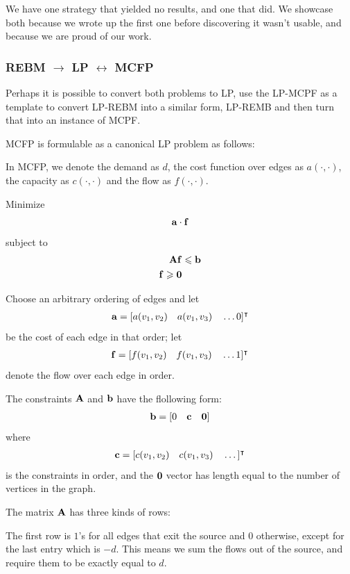 We have one strategy that yielded no results, and one that did. We showcase
both because we wrote up the first one before discovering it wasn't usable,
and because we are proud of our work.

\subsubsection{REBM $\to$ LP $\leftrightarrow$ MCFP}

Perhaps it is possible to convert both problems to LP, use the
LP-MCPF as a template to convert LP-REBM into a similar form, LP-REMB\textprime
and then turn that into an instance of MCPF.

MCFP is formulable as a canonical LP problem as follows:

In MCFP, we denote the demand as $d$, the cost function over edges as $a(\cdot,\cdot)$, the
capacity as $c(\cdot,\cdot)$ and the flow as $f(\cdot, \cdot)$.

Minimize
\begin{align*}
  \bm{\mathrm{a}} \cdot \bm{\mathrm{f}}
\end{align*}
subject to
\begin{align*}
  \bm{\mathrm{A}} \bm{\mathrm{f}} &\leqslant \bm{\mathrm{b}} \\
  \bm{\mathrm{f}} \geqslant \bm{\mathrm{0}}
\end{align*}

Choose an arbitrary ordering of edges and let
\begin{align*}
  \bm{\mathrm{a}} = [a(v_1,v_2)\quad a(v_1,v_3) \quad \dots 0]^\intercal
\end{align*}
be the cost of each edge in that order; let
\begin{align*}
  \bm{\mathrm{f}} = [f(v_1, v_2)\quad f(v_1,v_3) \quad \dots 1]^\intercal
\end{align*}
denote the flow over each edge in order.

The constraints $\bm{\mathrm{A}}$ and $\bm{\mathrm{b}}$ have the flollowing form:
\begin{align*}
  \bm{\mathrm{b}} = [0\quad \bm{\mathrm{c}}\quad \bm{\mathrm{0}}]
\end{align*}
where
\begin{align*}
  \bm{\mathrm{c}} = [c(v_1, v_2)\quad c(v_1,v_3)\quad \dots]^\intercal
\end{align*}
is the constraints in order, and the $\bm{\mathrm{0}}$ vector has length
equal to the number of vertices in the graph.

The matrix $\bm{\mathrm{A}}$ has three kinds of rows:

The first row is $1$'s for all edges that exit the source and $0$ otherwise,
except for the last entry which is $-d$. This means we sum the flows out of the source,
and require them to be exactly equal to $d$.


